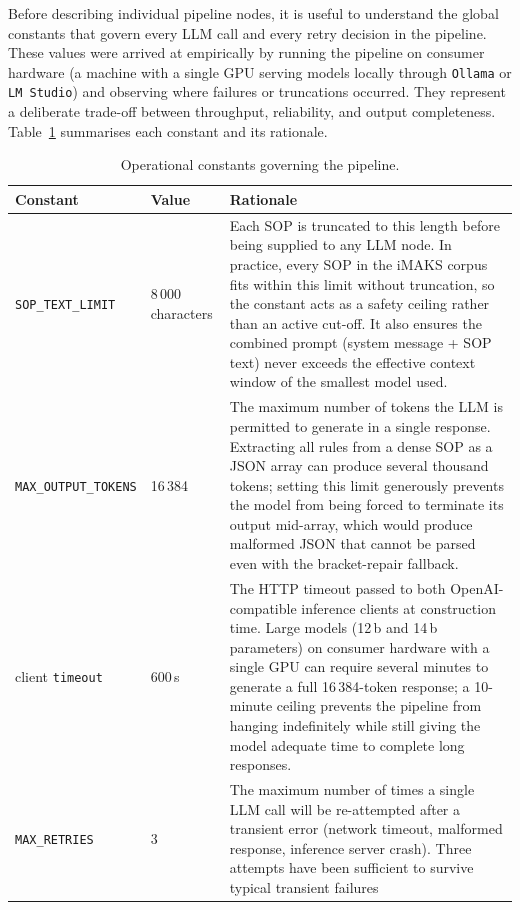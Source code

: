 ﻿\documentclass[11pt]{article}
\begin{document}
Before describing individual pipeline nodes, it is useful to understand the
global constants that govern every LLM call and every retry decision in the
pipeline. These values were arrived at empirically by running the pipeline on
consumer hardware (a machine with a single GPU serving models locally through
\texttt{Ollama} or \texttt{LM Studio}) and observing where failures or truncations
occurred. They represent a deliberate trade-off between throughput, reliability, and
output completeness. Table~\ref{tab:constants} summarises each constant and its
rationale.

\begin{table}[htbp]
\centering
\caption{Operational constants governing the pipeline.}
\label{tab:constants}
\begin{tabular}{@{} l p{4.0cm} p{7.5cm} @{}}
\toprule
\textbf{Constant} & \textbf{Value} & \textbf{Rationale} \\
\midrule
\texttt{SOP\_TEXT\_LIMIT}
  & 8\,000 characters
  & Each SOP is truncated to this length before being supplied to any LLM node.
    In practice, every SOP in the iMAKS corpus fits within this limit without
    truncation, so the constant acts as a safety ceiling rather than an active cut-off.
    It also ensures the combined prompt (system message + SOP text) never exceeds the
    effective context window of the smallest model used. \\
\texttt{MAX\_OUTPUT\_TOKENS}
  & 16\,384
  & The maximum number of tokens the LLM is permitted to generate in a single
    response.  Extracting all rules from a dense SOP as a JSON array can produce
    several thousand tokens; setting this limit generously prevents the model from
    being forced to terminate its output mid-array, which would produce malformed JSON
    that cannot be parsed even with the bracket-repair fallback. \\
client \texttt{timeout}
  & 600\,s
  & The HTTP timeout passed to both OpenAI-compatible inference clients at
    construction time.  Large models (12\,b and 14\,b parameters) on consumer
    hardware with a single GPU can require several minutes to generate a full
    16\,384-token response; a 10-minute ceiling prevents the pipeline from hanging
    indefinitely while still giving the model adequate time to complete long responses. \\
\texttt{MAX\_RETRIES}
  & 3
  & The maximum number of times a single LLM call will be re-attempted after a
    transient error (network timeout, malformed response, inference server crash).
    Three attempts have been sufficient to survive typical transient failures

\end{tabular}
\end{table}
\end{document}
